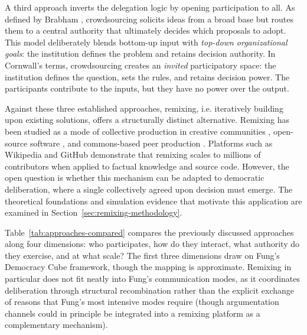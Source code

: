 \documentclass[a4paper, 12pt, twoside]{iviathesis}
\begin{document}
A third approach inverts the delegation logic by opening participation to all. As defined by Brabham \cite{brabham2013}, crowdsourcing solicits ideas from a broad base but routes them to a central authority that ultimately decides which proposals to adopt. This model deliberately blends bottom-up input with \textit{top-down organizational goals}: the institution defines the problem and retains decision authority. 
In Cornwall's \cite{cornwall2004} terms, crowdsourcing creates an \textit{invited} participatory space: the institution defines the question, sets the rules, and retains decision power. The participants contribute to the inputs, but they have no power over the output.

Against these three established approaches, remixing, i.e. iteratively building upon existing solutions, offers a structurally distinct alternative. Remixing has been studied as a mode of collective production in creative communities \cite{hill2013remixing}, open-source software \cite{sornette_how_2014}, and commons-based peer production \cite{benkler2006wealth}. Platforms such as Wikipedia and GitHub demonstrate that remixing scales to millions of contributors when applied to factual knowledge and source code. However, the open question is whether this mechanism can be adapted to democratic deliberation, where a single collectively agreed upon decision must emerge. The theoretical foundations and simulation evidence that motivate this application are examined in Section~\ref{sec:remixing-methodology}.

Table~\ref{tab:approaches-compared} compares the previously discussed approaches along four dimensions: who participates, how do they interact, what authority do they exercise, and at what scale? The first three dimensions draw on Fung's \cite{fung2006} Democracy Cube framework, though the mapping is approximate. Remixing in particular does not fit neatly into Fung's communication modes, as it coordinates deliberation through structural recombination rather than the explicit exchange of reasons that Fung's most intensive modes require (though argumentation channels could in principle be integrated into a remixing platform as a complementary mechanism).
\end{document}
